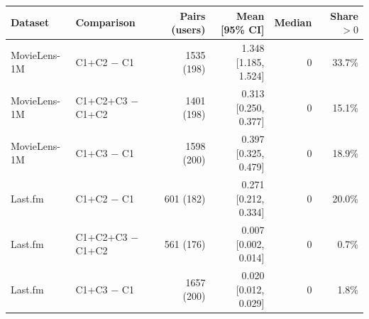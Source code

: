 \begin{tabular}{llrrrr}
\toprule
Dataset & Comparison & Pairs (users) & Mean [95\% CI] & Median & Share $>0$ \\
\midrule
MovieLens-1M & C1+C2 $-$ C1 & 1535 (198) & 1.348 [1.185, 1.524] & 0 & 33.7\% \\
MovieLens-1M & C1+C2+C3 $-$ C1+C2 & 1401 (198) & 0.313 [0.250, 0.377] & 0 & 15.1\% \\
MovieLens-1M & C1+C3 $-$ C1 & 1598 (200) & 0.397 [0.325, 0.479] & 0 & 18.9\% \\
Last.fm & C1+C2 $-$ C1 & 601 (182) & 0.271 [0.212, 0.334] & 0 & 20.0\% \\
Last.fm & C1+C2+C3 $-$ C1+C2 & 561 (176) & 0.007 [0.002, 0.014] & 0 & 0.7\% \\
Last.fm & C1+C3 $-$ C1 & 1657 (200) & 0.020 [0.012, 0.029] & 0 & 1.8\% \\
\bottomrule
\end{tabular}
